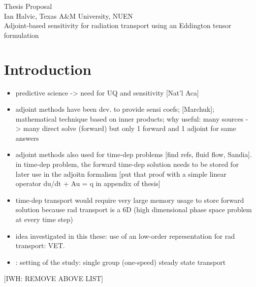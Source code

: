 \documentclass{article}
\begin{document}
\begin{center}
{\large Thesis Proposal }\\
Ian Halvic, Texas A\&M University, NUEN \\
Adjoint-based sensitivity for radiation transport using an Eddington tensor formulation \\
\end{center}

\tableofcontents

\section{Introduction}
\begin{itemize}
\item predictive science -> need for UQ and sensitivity [Nat'l Aca]
\item adjoint methods have been dev. to provide sensi coefs; [Marchuk]; mathematical technique based on inner products; why useful: many sources -> many direct solve (forward) but only 1 forward and 1 adjoint for same answers
\item adjoint methods also used for time-dep problems [find refs, fluid flow, Sandia]. in time-dep problem, the forward time-dep solution needs to be stored for later use in the adjoitn formalism [put that proof with a simple linear operator du/dt + Au = q in appendix of thesis]
\item time-dep transport would require very large memory usage to store forward solution because rad transport is a 6D (high dimensional phase space problem at every time step)
\item idea investigated in this these: use of an low-order representation for rad transport: VET. 
\item: setting of the study: single group (one-speed) steady state transport 
\end{itemize}
{\color{red}[IWH: REMOVE ABOVE LIST]}
\end{document}
